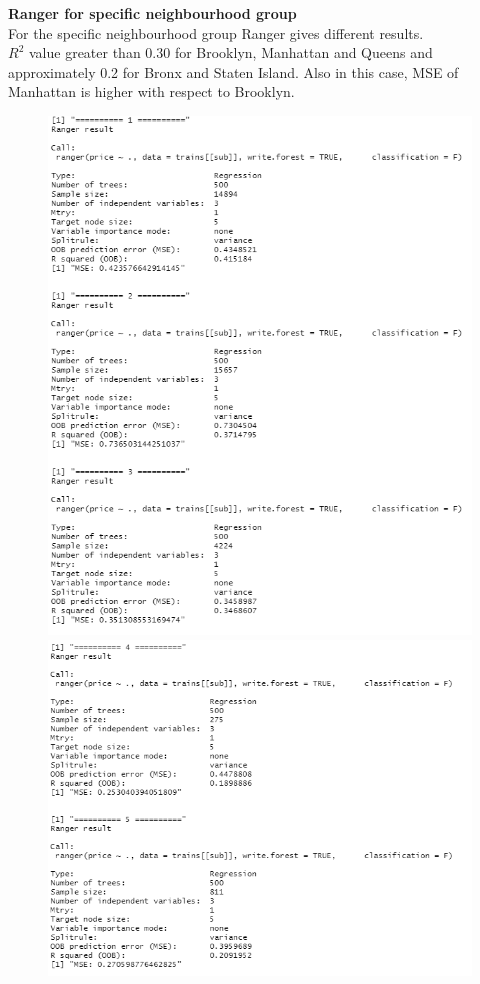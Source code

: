 \documentclass{FR16}
\begin{document}
\noindent \textbf{Ranger for specific neighbourhood group}\\
For the specific neighbourhood group Ranger gives different results. \\ $R^2$ value greater than 0.30 for Brooklyn, Manhattan and Queens and approximately 0.2 for Bronx and Staten Island. Also in this case, MSE of Manhattan is higher with respect to Brooklyn.
\begin{figure}[!htb]
   \begin{minipage}{0.48\textwidth}
     \centering
     \includegraphics[width=1\linewidth]{figures/rgn1.1.png} 
   \end{minipage}\hfill
   \begin{minipage}{0.48\textwidth}
     \centering
     \includegraphics[width=1\linewidth]{figures/rgn1.2.png}

\end{minipage}
\end{figure}
\end{document}

